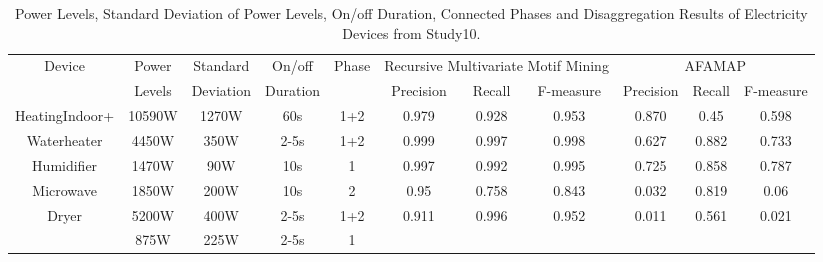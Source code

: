 \begin{table*}[!t]
\renewcommand{\arraystretch}{1.3}
\caption{Power Levels, Standard Deviation of Power Levels, On/off Duration, Connected Phases and Disaggregation Results of Electricity Devices from Study10.}
\label{table_study10results}
\centering
\footnotesize
\setlength\tabcolsep{2pt}
\begin{tabular}{|c|c|c|c|c|c|c|c|c|c|c|}
\hline
\multirow{2}{*}{Device} & Power & Standard & On/off &  \multirow{2}{*}{Phase} & \multicolumn{3}{|c|}{Recursive Multivariate Motif Mining} & \multicolumn{3}{|c|}{AFAMAP}\\
\cline{6-11}
           &  Levels & Deviation & Duration &  &Precision&  Recall &  F-measure & Precision & Recall & F-measure\\ 
\hline
\hline
\multirow{2}{*}{HeatingIndoor+} & \multirow{2}{*}{10590W} & \multirow{2}{*}{1270W} & \multirow{2}{*}{60s} & \multirow{2}{*}{1+2} & \multirow{2}{*}{0.979} & \multirow{2}{*}{0.928} & \multirow{2}{*}{0.953} & \multirow{2}{*}{0.870}& \multirow{2}{*}{0.45} & \multirow{2}{*}{0.598}\\
HeatingOutdoor &  &  &  &  &  &  &  &  & & \\
\hline
Waterheater & 4450W & 350W &  2-5s & 1+2 & 0.999 & 0.997 &0.998 &0.627& 0.882 &0.733\\
\hline
Humidifier & 1470W & 90W & 10s & 1 & 0.997 & 0.992 &0.995 & 0.725 & 0.858 & 0.787\\
\hline
Microwave & 1850W & 200W & 10s & 2 & 0.95 &0.758 & 0.843 & 0.032 & 0.819 & 0.06\\
\hline
\multirow{2}{*}{Dryer} & 5200W &400W & 2-5s & 1+2 & \multirow{2}{*}{0.911}&\multirow{2}{*}{0.996}&\multirow{2}{*}{0.952}& \multirow{2}{*}{0.011}&\multirow{2}{*}{0.561} & \multirow{2}{*}{0.021}\\
\cline{2-3} \cline{4-5}
                       & 875W &225W  & 2-5s & 1 & & & & & &\\
\hline
\end{tabular}
\end{table*}
